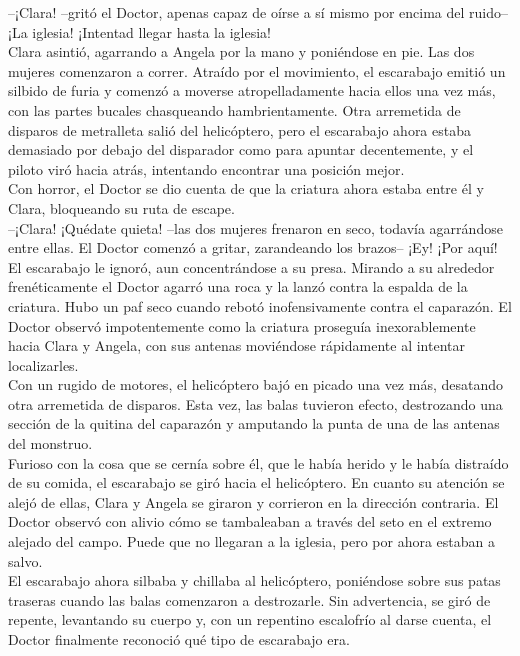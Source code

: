 --¡Clara! --gritó el Doctor, apenas capaz de oírse a sí mismo por encima
del ruido-- ¡La iglesia! ¡Intentad llegar hasta la iglesia!\\
Clara asintió, agarrando a Angela por la mano y poniéndose en pie. Las
dos mujeres comenzaron a correr. Atraído por el movimiento, el
escarabajo emitió un silbido de furia y comenzó a moverse
atropelladamente hacia ellos una vez más, con las partes bucales
chasqueando hambrientamente. Otra arremetida de disparos de metralleta
salió del helicóptero, pero el escarabajo ahora estaba demasiado por
debajo del disparador como para apuntar decentemente, y el piloto viró
hacia atrás, intentando encontrar una posición mejor.\\
Con horror, el Doctor se dio cuenta de que la criatura ahora estaba
entre él y Clara, bloqueando su ruta de escape.\\
--¡Clara! ¡Quédate quieta! --las dos mujeres frenaron en seco, todavía
agarrándose entre ellas. El Doctor comenzó a gritar, zarandeando los
brazos-- ¡Ey! ¡Por aquí!\\
El escarabajo le ignoró, aun concentrándose a su presa. Mirando a su
alrededor frenéticamente el Doctor agarró una roca y la lanzó contra la
espalda de la criatura. Hubo un paf seco cuando rebotó inofensivamente
contra el caparazón. El Doctor observó impotentemente como la criatura
proseguía inexorablemente hacia Clara y Angela, con sus antenas
moviéndose rápidamente al intentar localizarles.\\
Con un rugido de motores, el helicóptero bajó en picado una vez más,
desatando otra arremetida de disparos. Esta vez, las balas tuvieron
efecto, destrozando una sección de la quitina del caparazón y amputando
la punta de una de las antenas del monstruo.\\
Furioso con la cosa que se cernía sobre él, que le había herido y le
había distraído de su comida, el escarabajo se giró hacia el
helicóptero. En cuanto su atención se alejó de ellas, Clara y Angela se
giraron y corrieron en la dirección contraria. El Doctor observó con
alivio cómo se tambaleaban a través del seto en el extremo alejado del
campo. Puede que no llegaran a la iglesia, pero por ahora estaban a
salvo.\\
El escarabajo ahora silbaba y chillaba al helicóptero, poniéndose sobre
sus patas traseras cuando las balas comenzaron a destrozarle. Sin
advertencia, se giró de repente, levantando su cuerpo y, con un
repentino escalofrío al darse cuenta, el Doctor finalmente reconoció qué
tipo de escarabajo era.\\
